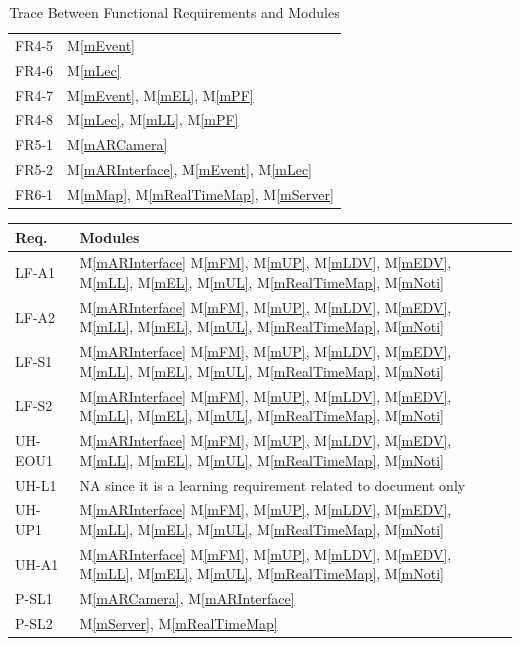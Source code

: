 \documentclass[12pt, titlepage]{article}
\newcommand{\mref}[1]{M\ref{#1}}
\begin{document}
\begin{table}[H]
\begin{tabular}{p{} p{}}
FR4-5 & \mref{mEvent}\\
FR4-6 & \mref{mLec}\\
FR4-7 & \mref{mEvent}, \mref{mEL}, \mref{mPF}\\
FR4-8 & \mref{mLec}, \mref{mLL}, \mref{mPF}\\
FR5-1 & \mref{mARCamera}\\
FR5-2 & \mref{mARInterface}, \mref{mEvent}, \mref{mLec}\\
FR6-1 & \mref{mMap}, \mref{mRealTimeMap}, \mref{mServer}\\
\bottomrule
\end{tabular}
\caption{Trace Between Functional Requirements and Modules}
\label{TblFRT}
\end{table}

\begin{table}[H]
\centering
\begin{tabular}{p{} p{}}
\toprule
\textbf{Req.} & \textbf{Modules}\\
\midrule
LF-A1 & \mref{mARInterface} \mref{mFM}, \mref{mUP}, \mref{mLDV}, \mref{mEDV}, \mref{mLL}, \mref{mEL}, \mref{mUL}, \mref{mRealTimeMap}, \mref{mNoti}\\
LF-A2 & \mref{mARInterface} \mref{mFM}, \mref{mUP}, \mref{mLDV}, \mref{mEDV}, \mref{mLL}, \mref{mEL}, \mref{mUL}, \mref{mRealTimeMap}, \mref{mNoti}\\
LF-S1 & \mref{mARInterface} \mref{mFM}, \mref{mUP}, \mref{mLDV}, \mref{mEDV}, \mref{mLL}, \mref{mEL}, \mref{mUL}, \mref{mRealTimeMap}, \mref{mNoti}\\
LF-S2 & \mref{mARInterface} \mref{mFM}, \mref{mUP}, \mref{mLDV}, \mref{mEDV}, \mref{mLL}, \mref{mEL}, \mref{mUL}, \mref{mRealTimeMap}, \mref{mNoti}\\
UH-EOU1 & \mref{mARInterface} \mref{mFM}, \mref{mUP}, \mref{mLDV}, \mref{mEDV}, \mref{mLL}, \mref{mEL}, \mref{mUL}, \mref{mRealTimeMap}, \mref{mNoti}\\
UH-L1 & NA since it is a learning requirement related to document only\\
UH-UP1 & \mref{mARInterface} \mref{mFM}, \mref{mUP}, \mref{mLDV}, \mref{mEDV}, \mref{mLL}, \mref{mEL}, \mref{mUL}, \mref{mRealTimeMap}, \mref{mNoti}\\
UH-A1 & \mref{mARInterface} \mref{mFM}, \mref{mUP}, \mref{mLDV}, \mref{mEDV}, \mref{mLL}, \mref{mEL}, \mref{mUL}, \mref{mRealTimeMap}, \mref{mNoti}\\
P-SL1 & \mref{mARCamera}, \mref{mARInterface}\\
P-SL2 & \mref{mServer}, \mref{mRealTimeMap}\\

\end{tabular}
\end{table}
\end{document}
